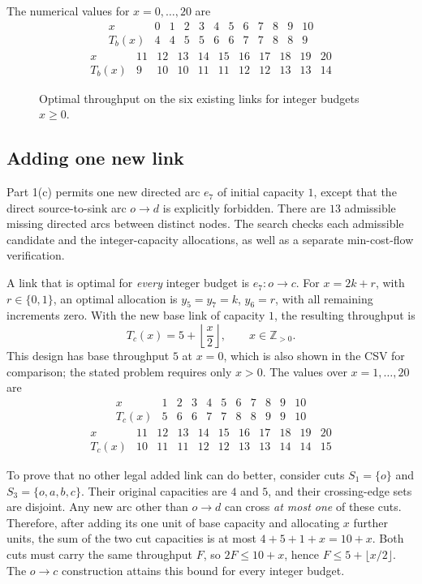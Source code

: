 \documentclass[11pt,a4paper]{article}
\begin{document}
The numerical values for \(x=0,\ldots,20\) are
\[
\begin{array}{c|ccccccccccc}
x &0&1&2&3&4&5&6&7&8&9&10\\
\hline
T_b(x)&4&4&5&5&6&6&7&7&8&8&9
\end{array}
\]
\[
\begin{array}{c|cccccccccc}
x &11&12&13&14&15&16&17&18&19&20\\
\hline
T_b(x)&9&10&10&11&11&12&12&13&13&14
\end{array}
\]

\begin{figure}[h]
\centering

\caption{Optimal throughput on the six existing links for integer budgets \(x\ge0\).}
\label{fig:exercise1-b-throughput}
\end{figure}

\subsection*{Adding one new link}

Part 1(c) permits one new directed arc \(e_7\) of initial capacity \(1\),
except that the direct source-to-sink arc \(o\to d\) is explicitly
forbidden. There are \(13\) admissible missing directed arcs between
distinct nodes. The search checks each admissible candidate and the
integer-capacity allocations, as well as a separate min-cost-flow
verification.

A link that is optimal for \emph{every} integer budget is
\(e_7:o\to c\). For \(x=2k+r\), with \(r\in\{0,1\}\), an optimal
allocation is \(y_5=y_7=k\), \(y_6=r\), with all remaining increments
zero. With the new base link of capacity \(1\), the resulting throughput is
\[
T_c(x)=5+\left\lfloor\frac{x}{2}\right\rfloor,
\qquad x\in\mathbb Z_{>0}.
\]
This design has base throughput \(5\) at \(x=0\), which is also shown
in the CSV for comparison; the stated problem requires only \(x>0\).
The values over \(x=1,\ldots,20\) are
\[
\begin{array}{c|cccccccccc}
x &1&2&3&4&5&6&7&8&9&10\\
\hline
T_c(x)&5&6&6&7&7&8&8&9&9&10
\end{array}
\]
\[
\begin{array}{c|cccccccccc}
x &11&12&13&14&15&16&17&18&19&20\\
\hline
T_c(x)&10&11&11&12&12&13&13&14&14&15
\end{array}
\]

To prove that no other legal added link can do better, consider cuts
\(S_1=\{o\}\) and \(S_3=\{o,a,b,c\}\). Their original capacities
are \(4\) and \(5\), and their crossing-edge sets are disjoint. Any
new arc other than \(o\to d\) can cross \emph{at most one} of these
cuts. Therefore, after adding its one unit of base capacity and allocating
\(x\) further units, the sum of the two cut capacities is at most
\(4+5+1+x=10+x\). Both cuts must carry the same throughput \(F\), so
\(2F\le10+x\), hence
\(F\le5+\lfloor x/2\rfloor\). The \(o\to c\) construction attains
this bound for every integer budget.
\end{document}
